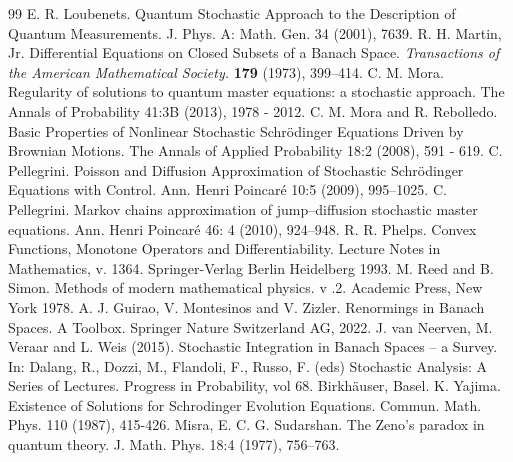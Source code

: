 \documentclass[10pt,a4paper]{amsart}
\begin{document}
\begin{thebibliography}{99}
 E. R. Loubenets. Quantum Stochastic Approach to the Description of Quantum Measurements. J. Phys. A: Math. Gen. 34 (2001), 7639.
 R. H. Martin, Jr. Differential Equations on Closed Subsets of a Banach Space. \emph{Transactions of the American Mathematical Society.} \textbf{179} (1973), 399--414.
 C. M. Mora. Regularity of solutions to quantum master equations: a stochastic approach. The Annals of Probability 41:3B (2013), 1978 - 2012.
 C. M. Mora and R. Rebolledo. Basic Properties of Nonlinear Stochastic Schrödinger Equations Driven by Brownian Motions. The Annals of Applied Probability 18:2 (2008), 591 - 619.
 C. Pellegrini. Poisson and Diffusion Approximation of Stochastic Schr\"odinger Equations with Control. Ann. Henri Poincar\'e 10:5 (2009), 995–1025.
 C. Pellegrini. Markov chains approximation of jump–diffusion stochastic master equations. Ann. Henri Poincar\'e 46: 4 (2010), 924–948.
 R. R. Phelps. Convex Functions, Monotone Operators and Differentiability. Lecture Notes in Mathematics, v. 1364. Springer-Verlag Berlin Heidelberg 1993.
 M. Reed and B. Simon. Methods of modern mathematical physics. v .2. Academic Press, New York 1978.
 A. J. Guirao, V. Montesinos and V. Zizler. Renormings in Banach Spaces. A Toolbox. Springer Nature Switzerland AG, 2022.
 J. van Neerven, M. Veraar and L. Weis (2015). Stochastic Integration in Banach Spaces – a Survey. In: Dalang, R., Dozzi, M., Flandoli, F., Russo, F. (eds) Stochastic Analysis: A Series of Lectures. Progress in Probability, vol 68. Birkhäuser, Basel. %
 K. Yajima. Existence of Solutions for Schrodinger Evolution Equations. Commun. Math. Phys. 110 (1987), 415-426.
 Misra, E. C. G. Sudarshan. The Zeno's paradox in quantum theory. J. Math. Phys. 18:4 (1977), 756–763.
\end{thebibliography}
\end{document}

